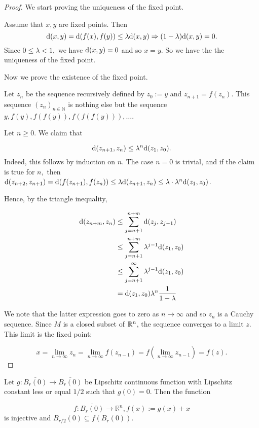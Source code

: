 \begin{proof}
We start  proving the uniqueness of the fixed point. 

Assume  that \(x, y\) are fixed points. Then
\[\mathrm d(x, y) = \mathrm d(f(x), f(y)) \le \lambda \mathrm d(x, y) \Rightarrow (1 - \lambda) \mathrm d(x, y) = 0.\]
Since \(0 \le \lambda < 1,\) we have 
\(\mathrm d(x, y) = 0\) and so $ x = y$. So we have the  the uniqueness of the fixed point. 


Now we prove the existence of the fixed point.

Let $z_n$  be the sequence recursively defined  by  \(z_0 := y\) and \(z_{n+1} = f(z_n)\). This sequence 
\((z_n)_{n \in \mathbb N}\) is nothing else but the sequence
\(y, f(y), f(f(y)), f(f(f(y))), \ldots\).

Let \(n \ge 0\). We claim that

\[\mathrm d(z_{n+1}, z_n) \le \lambda^n \mathrm d(z_1, z_0).\] Indeed, this follows by
induction on \(n\). The case \(n=0\) is trivial, and if the claim is
true for \(n,\) then
\(\mathrm d(z_{n+2}, z_{n+1}) = \mathrm d(f(z_{n+1}), f(z_n)) \le \lambda \mathrm d(z_{n+1}, z_n) \le \lambda \cdot \lambda^n \mathrm d(z_1, z_0)\).

Hence, by the triangle inequality,

\begin{align}
\mathrm d(z_{n + m}, z_n) & \le \sum_{j=n+1}^{n+m} \mathrm d(z_j, z_{j-1}) \\
& \le \sum_{j=n+1}^{n+m} \lambda^{j-1} \mathrm d(z_1, z_0) \\
& \le \sum_{j=n+1}^\infty \lambda^{j-1} \mathrm d(z_1, z_0) \\
& = \mathrm d(z_1, z_0) \lambda^n \frac{1}{1 - \lambda}
\end{align}

We note that the latter expression goes to zero as \(n \to \infty\)
and so  $z_n$ is a Cauchy sequence. 
Since $M$ is a  closed subset of $\mathbb{R}^n$, the sequence converges to a limit \(z\). This limit  is the
fixed point:

\[x = \lim_{n \to \infty} z_n = \lim_{n \to \infty} f(z_{n-1}) = f(\lim_{n \to \infty} z_{n-1}) = f(z).\]

\end{proof}



\begin{lemma}
Let \(g: \overline{B_r(0)} \to \overline{B_r(0)}\) be  Lipschitz continuous function  with Lipschitz
constant less or equal \(1/2\) such that \(g(0) = 0\). Then the function

\[f: \overline{B_r(0)} \to \mathbb R^n, f(x) := g(x) + x\] is injective
and \(B_{r/2}(0) \subseteq f(B_r(0))\).
\end{lemma}


